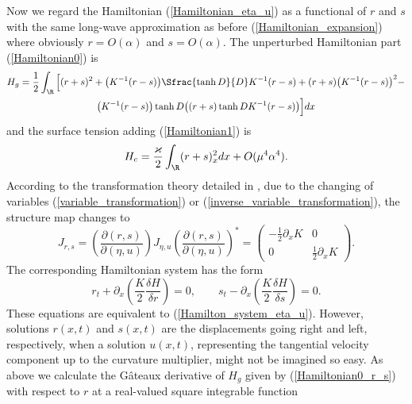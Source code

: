 Now we regard the Hamiltonian (\ref{Hamiltonian_eta_u})
as a functional of $r$ and $s$
with the same long-wave approximation as before (\ref{Hamiltonian_expansion})
where obviously $r = O(\alpha)$ and
$s = O(\alpha)$.
The unperturbed Hamiltonian part (\ref{Hamiltonian0}) is
%
\begin{multline}
\label{Hamiltonian0_r_s}
	H_g =
	\frac 12 \int_\R
	\Big[
		(r + s)^2 + \big( K^{-1} (r - s) \big) \Sfrac{\tanh D}{D}
		K^{-1} (r - s) + (r + s) \big( K^{-1} (r - s) \big) ^2 -
	\\
		\big( K^{-1} (r - s) \big) \tanh{D} \big( (r + s)
		\tanh{D} K^{-1} (r - s) \big)
	\Big]
	dx
\end{multline}
%
and the surface tension adding (\ref{Hamiltonian1}) is
%
\begin{equation}
\label{Hamiltonian1_r_s}
	H_c
	=
	\frac{\varkappa}{2} \int_\R (r + s)_x^2 dx 
	+ O(\mu^4 \alpha^4)
	.
\end{equation}
%
According to the transformation theory detailed in \cite{Craig2005},
due to the changing of variables (\ref{variable_transformation})
or (\ref{inverse_variable_transformation}), the structure
map changes to
%
\[
	J_{r,s}
	=
	\left( \frac{\partial (r,s)}{\partial (\eta, u)} \right) J_{\eta, u}  
	\left( \frac{\partial (r,s)}{\partial (\eta, u)} \right)^*
	= 
	\begin{pmatrix}
		-\frac 12 \partial_x K & 0
		\\
		0 & \frac 12 \partial_x K
	\end{pmatrix}
	.
\]
%
The corresponding Hamiltonian system has the form
%
\begin{equation}
\label{Hamilton_system_r_s}
	r_t + \partial_x \left( \frac{K}{2} \frac{\delta H}{\delta r} \right) = 0
	, 
	\quad \quad 
	s_t - \partial_x \left( \frac{K}{2} \frac{\delta H}{\delta s} \right) = 0
	.
\end{equation}
%
These equations are equivalent to (\ref{Hamilton_system_eta_u}).
However, solutions $r(x,t)$ and $s(x,t)$ are the displacements
going right and left, respectively,
when a solution $u(x,t)$, representing the tangential velocity component
up to the curvature multiplier,
might not be imagined so easy.
As above we calculate the  G\^ateaux derivative of $H_g$
given by (\ref{Hamiltonian0_r_s})
with respect to $r$ at a real-valued square integrable function
%
